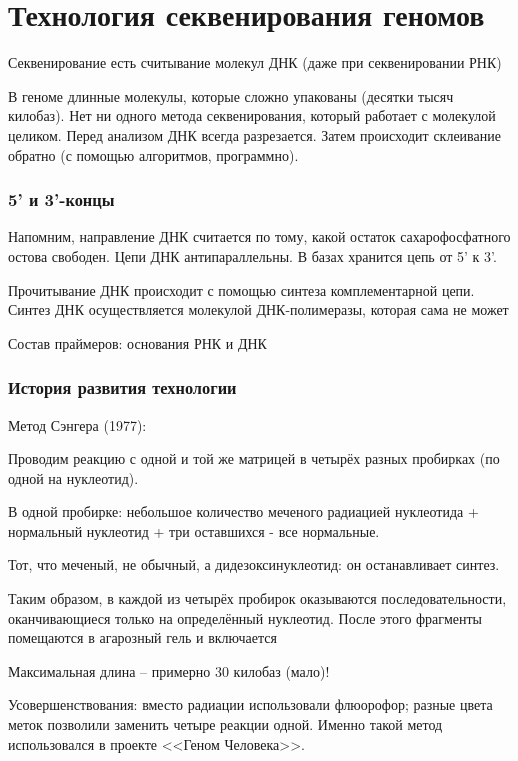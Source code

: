 \documentclass[main.tex]{subfiles}
\begin{document}
\section{Технология секвенирования геномов}

Секвенирование есть считывание молекул ДНК (даже при секвенировании РНК)

В геноме длинные молекулы, которые сложно упакованы (десятки тысяч килобаз).
Нет ни одного метода секвенирования, который работает с молекулой целиком.
Перед анализом ДНК всегда разрезается.
Затем происходит склеивание обратно (с помощью алгоритмов, программно).

\subsubsection{5' и 3'-концы}

Напомним, направление ДНК считается по тому, какой остаток сахарофосфатного остова свободен.
Цепи ДНК антипараллельны.
В базах хранится цепь от 5' к 3'.

Прочитывание ДНК происходит с помощью синтеза комплементарной цепи.
Синтез ДНК осуществляется молекулой ДНК-полимеразы, которая сама не может

Состав праймеров: основания РНК и ДНК

\subsubsection{История развития технологии}

Метод Сэнгера (1977):

Проводим реакцию с одной и той же матрицей в четырёх разных пробирках (по одной на нуклеотид).

В одной пробирке: небольшое количество меченого радиацией нуклеотида + нормальный нуклеотид + три оставшихся - все нормальные.

Тот, что меченый, не обычный, а дидезоксинуклеотид: он останавливает синтез.

Таким образом, в каждой из четырёх пробирок оказываются последовательности, оканчивающиеся только на определённый нуклеотид.
После этого фрагменты помещаются в агарозный гель и включается

Максимальная длина -- примерно 30 килобаз (мало)!

Усовершенствования:
вместо радиации использовали флюорофор; разные цвета меток позволили заменить четыре реакции одной.
Именно такой метод использовался в проекте <<Геном Человека>>.
\end{document}
